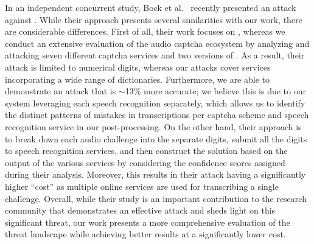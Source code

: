 In an independent concurrent study, Bock et al.~\cite{bock17uncaptcha} recently presented an attack against \re.
While their approach presents several similarities with our work, there are considerable differences. First of all,
their work focuses on \re, whereas we conduct an extensive evaluation of the audio captcha ecosystem by analyzing
and attacking seven different captcha services and two versions of \re. As a result, their attack is limited to
numerical digits, whereas our attacks cover services incorporating a wide range of dictionaries.
Furthermore, we are able to demonstrate 
an attack that is $\sim$13\% more accurate; we believe this is due to our system leveraging each speech recognition
separately, which allows us to identify the distinct patterns of mistakes in transcriptions per captcha scheme and speech 
recognition service in our post-processing. On the other hand, their approach is to break down each audio challenge into the separate digits,
submit all the digits to  speech recognition services, and then construct the solution based on the output of 
the various services by considering the confidence scores assigned during their analysis. Moreover, this results in their attack 
having a significantly higher ``cost'' as multiple online services are used for transcribing a single challenge.
Overall, while their study is an important contribution to the research community that demonstrates an effective attack and 
sheds light on this significant threat, our work presents a more comprehensive evaluation of the threat landscape while achieving 
better results at a significantly lower cost.

%
%
%
%

